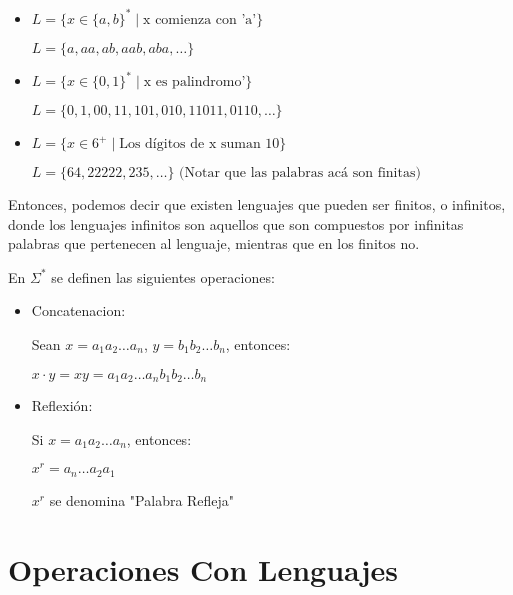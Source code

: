 \documentclass[12pt]{article}
\begin{document}
\begin{ejemplo}
  \begin{itemize}
    \item $L = \{ x \in \{a, b\}^* \mid \text{x comienza con 'a'} \}$

    $L = \{a, aa, ab, aab, aba, \dots\}$
    \item $L = \{ x \in \{0, 1\}^* \mid \text{x es palindromo'} \}$
    
    $L = \{0, 1, 00, 11, 101, 010, 11011, 0110, \dots\}$
    \item $L = \{ x \in 6^+ \mid \text{Los dígitos de x suman 10}\}$
    
    $L = \{64, 22222, 235, \dots\} \text{ (Notar que las palabras acá son finitas)}$
  \end{itemize}
\end{ejemplo}

\vspace{1em}
Entonces, podemos decir que existen lenguajes que pueden ser finitos, o infinitos, donde los lenguajes infinitos son aquellos que son compuestos por infinitas palabras que pertenecen al lenguaje, mientras que en los finitos no.
\vspace{2em}

\hspace{1em}
En $\Sigma^*$ se definen las siguientes operaciones:
\begin{itemize}
  \item Concatenacion:
  \begin{center}
    Sean $x = a_1a_2 \dots a_n$, $y = b_1b_2 \dots b_n$, entonces:

    $x\cdot y = xy = a_1a_2 \dots a_nb_1b_2 \dots b_n$
  \end{center}
  \item Reflexión:
  \begin{center}
    Si $x = a_1a_2 \dots a_n$, entonces:

    $x^r  = a_n\dots a_2a_1$

    $x^r$ se denomina "Palabra Refleja"
  \end{center}
\end{itemize}

\section{Operaciones Con Lenguajes}
\end{document}

